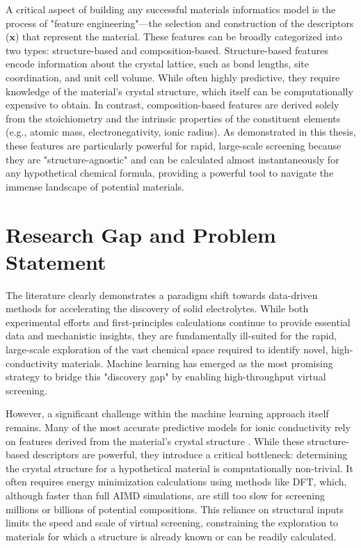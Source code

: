 A critical aspect of building any successful materials informatics model is the process of "feature engineering"—the selection and construction of the descriptors (\(\mathbf{x}\)) that represent the material. These features can be broadly categorized into two types: structure-based and composition-based. Structure-based features encode information about the crystal lattice, such as bond lengths, site coordination, and unit cell volume. While often highly predictive, they require knowledge of the material's crystal structure, which itself can be computationally expensive to obtain. In contrast, composition-based features are derived solely from the stoichiometry and the intrinsic properties of the constituent elements (e.g., atomic mass, electronegativity, ionic radius). As demonstrated in this thesis, these features are particularly powerful for rapid, large-scale screening because they are "structure-agnostic" and can be calculated almost instantaneously for any hypothetical chemical formula, providing a powerful tool to navigate the immense landscape of potential materials.

\section{Research Gap and Problem Statement}

The literature clearly demonstrates a paradigm shift towards data-driven methods for accelerating the discovery of solid electrolytes. While both experimental efforts and first-principles calculations continue to provide essential data and mechanistic insights, they are fundamentally ill-suited for the rapid, large-scale exploration of the vast chemical space required to identify novel, high-conductivity materials. Machine learning has emerged as the most promising strategy to bridge this "discovery gap" by enabling high-throughput virtual screening.

However, a significant challenge within the machine learning approach itself remains. Many of the most accurate predictive models for ionic conductivity rely on features derived from the material's crystal structure \cite{Jalem2021, Sendek2017}. While these structure-based descriptors are powerful, they introduce a critical bottleneck: determining the crystal structure for a hypothetical material is computationally non-trivial. It often requires energy minimization calculations using methods like DFT, which, although faster than full AIMD simulations, are still too slow for screening millions or billions of potential compositions. This reliance on structural inputs limits the speed and scale of virtual screening, constraining the exploration to materials for which a structure is already known or can be readily calculated.


